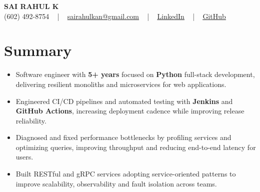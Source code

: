 \documentclass[letterpaper,11pt]{article}
\newcommand{\resumeItem}[1]{
  \item\footnotesize{
    {#1 \vspace{-2pt}}
  }
}
\newcommand{\resumeItemListStart}{\begin{itemize}[leftmargin=*]}
\newcommand{\resumeItemListEnd}{\end{itemize}\vspace{-5pt}}
\begin{document}
\begin{center}
    {\fontsize{14pt}{12pt}\selectfont \textbf{\MakeUppercase{Sai Rahul K}}}\\ \vspace{2pt}
    \fontsize{10pt}{12pt}\selectfont (602) 492-8754 ~ | ~ \href{mailto:sairahulkan@gmail.com}{sairahulkan@gmail.com} ~ | ~
    \href{https://www.linkedin.com/in/rq123/}{\color{blue}\underline{LinkedIn}} ~ | ~
    \href{https://github.com/kanrahuldo}{\color{blue}\underline{GitHub}}~
    \vspace{-8pt}
\end{center}

\section{Summary}
\fontsize{9pt}{10pt}\selectfont
\resumeItemListStart
    \resumeItem{Software engineer with \textbf{5+ years} focused on \textbf{Python} full-stack development, delivering resilient monoliths and microservices for web applications.}
    \resumeItem{Engineered CI/CD pipelines and automated testing with \textbf{Jenkins} and \textbf{GitHub Actions}, increasing deployment cadence while improving release reliability.}
    \resumeItem{Diagnosed and fixed performance bottlenecks by profiling services and optimizing queries, improving throughput and reducing end-to-end latency for users.}
    \resumeItem{Built RESTful and gRPC services adopting service-oriented patterns to improve scalability, observability and fault isolation across teams.}
\resumeItemListEnd
\vspace{-6pt}
\end{document}
